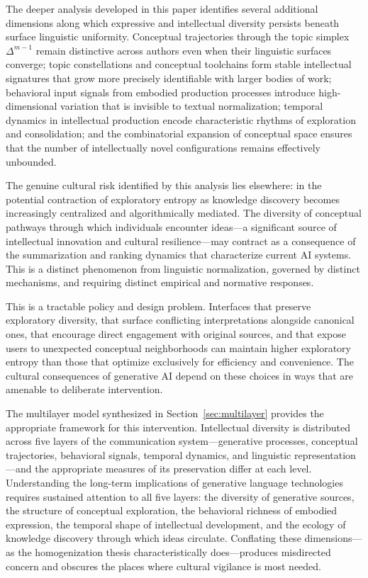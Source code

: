 \documentclass[12pt,a4paper]{article}
\theoremstyle{definition}
\theoremstyle{plain}
\theoremstyle{remark}
\begin{document}
The deeper analysis developed in this paper identifies several additional dimensions along
which expressive and intellectual diversity persists beneath surface linguistic uniformity.
Conceptual trajectories through the topic simplex $\Delta^{m-1}$ remain distinctive across
authors even when their linguistic surfaces converge; topic constellations and conceptual
toolchains form stable intellectual signatures that grow more precisely identifiable with
larger bodies of work; behavioral input signals from embodied production processes introduce
high-dimensional variation that is invisible to textual normalization; temporal dynamics in
intellectual production encode characteristic rhythms of exploration and consolidation; and
the combinatorial expansion of conceptual space ensures that the number of intellectually
novel configurations remains effectively unbounded.

The genuine cultural risk identified by this analysis lies elsewhere: in the potential
contraction of exploratory entropy as knowledge discovery becomes increasingly centralized
and algorithmically mediated. The diversity of conceptual pathways through which individuals
encounter ideas---a significant source of intellectual innovation and cultural
resilience---may contract as a consequence of the summarization and ranking dynamics that
characterize current AI systems. This is a distinct phenomenon from linguistic normalization,
governed by distinct mechanisms, and requiring distinct empirical and normative responses.

This is a tractable policy and design problem. Interfaces that preserve exploratory diversity,
that surface conflicting interpretations alongside canonical ones, that encourage direct
engagement with original sources, and that expose users to unexpected conceptual neighborhoods
can maintain higher exploratory entropy than those that optimize exclusively for efficiency
and convenience. The cultural consequences of generative AI depend on these choices in ways
that are amenable to deliberate intervention.

The multilayer model synthesized in Section~\ref{sec:multilayer} provides the appropriate
framework for this intervention. Intellectual diversity is distributed across five layers of
the communication system---generative processes, conceptual trajectories, behavioral signals,
temporal dynamics, and linguistic representation---and the appropriate measures of its
preservation differ at each level. Understanding the long-term implications of generative
language technologies requires sustained attention to all five layers: the diversity of
generative sources, the structure of conceptual exploration, the behavioral richness of
embodied expression, the temporal shape of intellectual development, and the ecology of
knowledge discovery through which ideas circulate. Conflating these dimensions---as the
homogenization thesis characteristically does---produces misdirected concern and obscures the
places where cultural vigilance is most needed.
\end{document}
